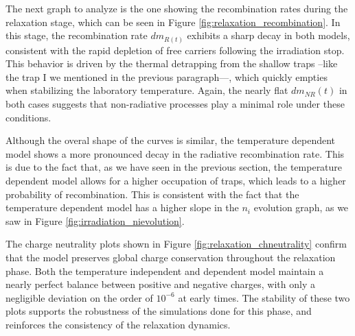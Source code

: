 \vspace{10pt}

The next graph to analyze is the one showing the recombination rates during the relaxation stage, which can be seen in Figure \ref{fig:relaxation_recombination}. In this stage, the recombination rate $dm_{R(t)}$ exhibits a sharp decay in both models, consistent with the rapid depletion of free carriers following the irradiation stop. This behavior is driven by the thermal detrapping from the shallow traps --like the trap I we mentioned in the previous paragraph---, which quickly empties when stabilizing the laboratory temperature. Again, the nearly flat $dm_{NR}(t)$ in both cases suggests that non-radiative processes play a minimal role under these conditions.

\vspace{10pt}

Although the overal shape of the curves is similar, the temperature dependent model shows a more pronounced decay in the radiative recombination rate. This is due to the fact that, as we have seen in the previous section, the temperature dependent model allows for a higher occupation of traps, which leads to a higher probability of recombination. This is consistent with the fact that the temperature dependent model has a higher slope in the $n_i$ evolution graph, as we saw in Figure \ref{fig:irradiation_nievolution}.

\vspace{10pt}

The charge neutrality plots shown in Figure \ref{fig:relaxation_chneutrality} confirm that the model preserves global charge conservation throughout the relaxation phase. Both the temperature independent and dependent model maintain a nearly perfect balance between positive and negative charges, with only a negligible deviation on the order of $10^{-6}$ at early times. The stability of these two plots supports the robustness of the simulations done for this phase, and reinforces the consistency of the relaxation dynamics.


